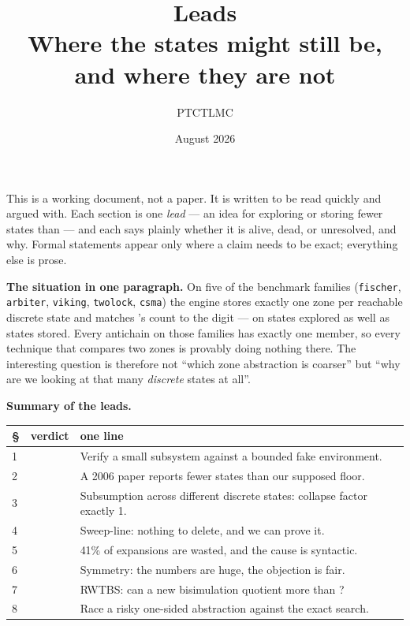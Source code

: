 \documentclass[11pt]{article}
\title{Leads\\[2pt]\large Where the states might still be, and where they are not}
\author{PTCTLMC}
\date{August 2026}
\begin{document}
\maketitle

\noindent
This is a working document, not a paper. It is written to be read quickly and argued with.
Each section is one \emph{lead} --- an idea for exploring or storing fewer states than \uppaal{}
--- and each says plainly whether it is alive, dead, or unresolved, and why. Formal statements
appear only where a claim needs to be exact; everything else is prose.

\medskip\noindent
\textbf{The situation in one paragraph.} On five of the benchmark families (\texttt{fischer},
\texttt{arbiter}, \texttt{viking}, \texttt{twolock}, \texttt{csma}) the engine stores exactly one
zone per reachable discrete state and matches \verifyta{}'s count to the digit --- on states
explored as well as states stored. Every antichain on those families has exactly one member, so
every technique that compares two zones is provably doing nothing there. The interesting question
is therefore not ``which zone abstraction is coarser'' but ``why are we looking at that many
\emph{discrete} states at all''.

\medskip\noindent
\textbf{Summary of the leads.}

\begin{center}
\begin{tabular}{@{}llp{7.4cm}@{}}
\toprule
\S & verdict & one line \\
\midrule
1 & \live{}  & Verify a small subsystem against a bounded fake environment. \\
2 & \open{}  & A 2006 paper reports fewer states than our supposed floor. \\
3 & \dead{}  & Subsumption across different discrete states: collapse factor exactly 1. \\
4 & \dead{}  & Sweep-line: nothing to delete, and we can prove it. \\
5 & \live{}  & 41\% of expansions are wasted, and the cause is syntactic. \\
6 & \open{}  & Symmetry: the numbers are huge, the objection is fair. \\
7 & \open{}  & RWTBS: can a new bisimulation quotient more than \uppaal{}? \\
8 & \live{}  & Race a risky one-sided abstraction against the exact search. \\
\bottomrule
\end{tabular}
\end{center}









\end{document}
